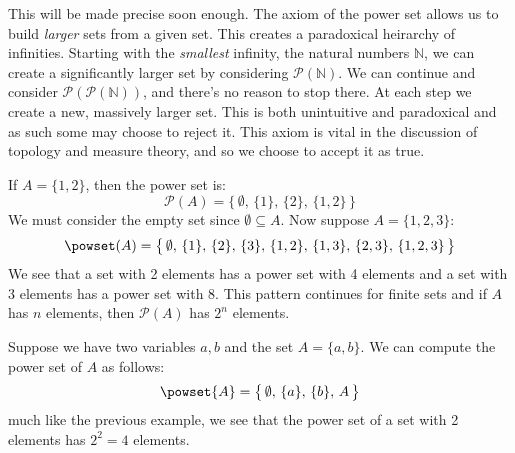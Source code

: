         This will be made precise soon enough. The axiom of the power set allows
        us to build \textit{larger} sets from a given set. This creates a
        paradoxical heirarchy of infinities. Starting with the \textit{smallest}
        infinity, the natural numbers $\mathbb{N}$, we can create a
        significantly larger set by considering $\mathcal{P}(\mathbb{N})$. We
        can continue and consider $\mathcal{P}(\mathcal{P}(\mathbb{N}))$, and
        there's no reason to stop there. At each step we create a new, massively
        larger set. This is both unintuitive and paradoxical and as such some
        may choose to reject it. This axiom is vital in the discussion of
        topology and measure theory, and so we choose to accept it as true.
        \begin{example}
            If $A=\{1,2\}$, then the power set is:
            \begin{equation}
                \mathcal{P}(A)=\big\{\,\emptyset,\,\{1\},\,\{2\},\,
                    \{1,2\}\,\big\}
            \end{equation}
            We must consider the empty set since $\emptyset\subseteq{A}$.
            Now suppose $A=\{1,2,3\}$:
            \begin{equation}
                \powset(A)=\big\{\,\emptyset,\,\{1\},\,\{2\},\,\{3\},\,
                    \{1,2\},\,\{1,3\},\,\{2,3\},\,\{1,2,3\}\,\big\}
            \end{equation}
            We see that a set with 2 elements has a power set with 4 elements
            and a set with 3 elements has a power set with 8. This pattern
            continues for finite sets and if $A$ has $n$ elements, then
            $\mathcal{P}(A)$ has $2^{n}$ elements.
        \end{example}
        \begin{example}
            Suppose we have two variables $a,b$ and the set $A=\{a,b\}$. We can
            compute the power set of $A$ as follows:
            \begin{equation}
                \powset{A}=\big\{\,\emptyset,\,\{a\},\,\{b\},\,A\,\big\}
            \end{equation}
            much like the previous example, we see that the power set of a set
            with 2 elements has $2^{2}=4$ elements.
        \end{example}

